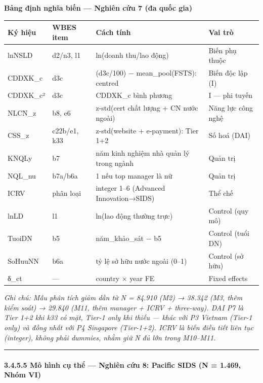 \documentclass[12pt,a4paper]{article}
\begin{document}
\textbf{Bảng định nghĩa biến --- Nghiên cứu 7 (đa quốc gia)}

\begin{longtable}[]{@{}llll@{}}
\toprule\noalign{}
Ký hiệu & WBES item & Cách tính & Vai trò \\
\midrule\noalign{}
\endhead
\bottomrule\noalign{}
\endlastfoot
lnNSLD & d2/n3, l1 & ln(doanh thu/lao động) & Biến phụ thuộc \\
CDDXK\_c & d3c & (d3c/100) − mean\_pool(FSTS): centred & Biến độc lập
(I) \\
CDDXK\_c² & d3c & CDDXK\_c bình phương & I --- phi tuyến \\
NLCN\_z & b8, e6 & z-std(cert chất lượng + CN nước ngoài) & Năng lực
công nghệ \\
CSS\_z & c22b/e1, k33 & z-std(website + e-payment): Tier 1+2 & Số hoá
(DAI) \\
KNQLy & b7 & năm kinh nghiệm nhà quản lý trong ngành & Quản trị \\
NQL\_nu & b7a/b6a & 1 nếu top manager là nữ & Quản trị \\
ICRV & phân loại & integer 1--6 (Advanced Innovation→SIDS) & Thể chế \\
lnLD & l1 & ln(lao động thường trực) & Control (quy mô) \\
TuoiDN & b5 & năm\_khảo\_sát − b5 & Control (tuổi DN) \\
SoHuuNN & b6a & tỷ lệ sở hữu nước ngoài (0--1) & Control (sở hữu) \\
δ\_ct & --- & country × year FE & Fixed effects \\
\end{longtable}

\emph{Ghi chú: Mẫu phân tích giảm dần từ N = 84.910 (M2) → 38.342 (M3,
thêm kiểm soát) → 29.840 (M11, thêm manager + ICRV + three-way). DAI P7
là Tier 1+2 khi k33 có mặt, Tier-1 only khi thiếu --- khác với P3
Vietnam (Tier-1 only) và đồng nhất với P4 Singapore (Tier-1+2). ICRV là
biến điều tiết liên tục (integer), không phải dummies, nhằm giữ N đủ lớn
trong M10--M11.}

\begin{center}\rule{0.5\linewidth}{0.5pt}\end{center}

\hypertarget{3455-muxf4-huxecnh-cux1ee5-thux1ec3--nghiuxean-cux1ee9u-8-pacific-sids-n--1469-nhuxf3m-vi}{%
\paragraph{3.4.5.5 Mô hình cụ thể --- Nghiên cứu 8: Pacific SIDS (N =
1.469, Nhóm
VI)}\label{3455-muxf4-huxecnh-cux1ee5-thux1ec3--nghiuxean-cux1ee9u-8-pacific-sids-n--1469-nhuxf3m-vi}}
\end{document}

